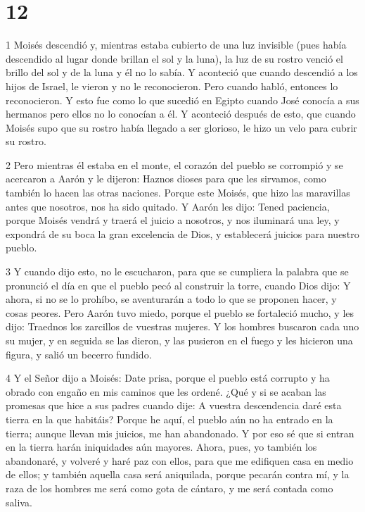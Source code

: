\chapter{12}

\par 1 Moisés descendió y, mientras estaba cubierto de una luz invisible (pues había descendido al lugar donde brillan el sol y la luna), la luz de su rostro venció el brillo del sol y de la luna y él no lo sabía. Y aconteció que cuando descendió a los hijos de Israel, le vieron y no le reconocieron. Pero cuando habló, entonces lo reconocieron. Y esto fue como lo que sucedió en Egipto cuando José conocía a sus hermanos pero ellos no lo conocían a él. Y aconteció después de esto, que cuando Moisés supo que su rostro había llegado a ser glorioso, le hizo un velo para cubrir su rostro.

\par 2 Pero mientras él estaba en el monte, el corazón del pueblo se corrompió y se acercaron a Aarón y le dijeron: Haznos dioses para que les sirvamos, como también lo hacen las otras naciones. Porque este Moisés, que hizo las maravillas antes que nosotros, nos ha sido quitado. Y Aarón les dijo: Tened paciencia, porque Moisés vendrá y traerá el juicio a nosotros, y nos iluminará una ley, y expondrá de su boca la gran excelencia de Dios, y establecerá juicios para nuestro pueblo.

\par 3 Y cuando dijo esto, no le escucharon, para que se cumpliera la palabra que se pronunció el día en que el pueblo pecó al construir la torre, cuando Dios dijo: Y ahora, si no se lo prohíbo, se aventurarán a todo lo que se proponen hacer, y cosas peores. Pero Aarón tuvo miedo, porque el pueblo se fortaleció mucho, y les dijo: Traednos los zarcillos de vuestras mujeres. Y los hombres buscaron cada uno su mujer, y en seguida se las dieron, y las pusieron en el fuego y les hicieron una figura, y salió un becerro fundido.

\par 4 Y el Señor dijo a Moisés: Date prisa, porque el pueblo está corrupto y ha obrado con engaño en mis caminos que les ordené. ¿Qué y si se acaban las promesas que hice a sus padres cuando dije: A vuestra descendencia daré esta tierra en la que habitáis? Porque he aquí, el pueblo aún no ha entrado en la tierra; aunque llevan mis juicios, me han abandonado. Y por eso sé que si entran en la tierra harán iniquidades aún mayores. Ahora, pues, yo también los abandonaré, y volveré y haré paz con ellos, para que me edifiquen casa en medio de ellos; y también aquella casa será aniquilada, porque pecarán contra mí, y la raza de los hombres me será como gota de cántaro, y me será contada como saliva.

